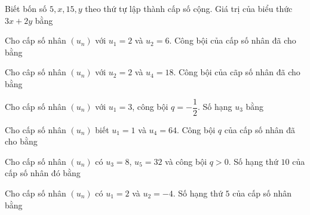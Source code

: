 \begin{ex}%
    Biết bốn số $5, x, 15, y$ theo thứ tự lập thành cấp số cộng. Giá trị của biểu thức $3 x+2 y$ bằng
\end{ex}
\begin{ex}%
    Cho cấp số nhân $(u_n)$ với $u_1=2$ và $u_2=6$. Công bội của cấp số nhân đã cho bằng
\end{ex}
\begin{ex}%
    Cho câp số nhân $(u_n)$ với $u_2=2$ và $u_4=18$. Công bội của cãp số nhân đã cho bằng
\end{ex}
\begin{ex}%
    Cho cấp số nhân $(u_n)$ với $u_1=3$, công bội $q=-\dfrac{1}{2}$. Số hạng $u_3$ bằng
\end{ex}
\begin{ex}%
    Cho cấp số nhân $(u_n)$ biết $u_1=1$ và $u_4=64$. Công bội $q$ của cấp số nhân đã cho bằng
\end{ex}
\begin{ex}%
Cho cấp số nhân $(u_n)$ có $u_3=8$, $u_5=32$ và công bội $q>0$. Số hạng thứ $10$ của cấp số nhân đó bằng
\end{ex}
\begin{ex}%
    Cho cấp số nhân $(u_n)$ có $u_1=2$ và $u_2=-4$. Số hạng thứ $5$ của cấp số nhân bằng
\end{ex}
